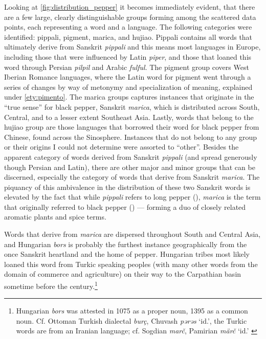 Looking at \cref{fig:distribution_pepper} it becomes immediately evident, that there are a few large, clearly distinguishable groups forming among the scattered data points, each representing a word and a language. The following categories were identified: pippali, pigment, marica, and hujiao. Pippali contains all words that ultimately derive from Sanskrit \textit{pippali} and this means most languages in Europe, including those that were influenced by Latin \textit{piper}, and those that loaned this word through Persian \textit{pilpil} and Arabic \textit{fulful}. The pigment group covers West Iberian Romance languages, where the Latin word for pigment went through a series of changes by way of metonymy and specialization of meaning, explained under \ref{ety:pimento}. The marica groups captures instances that originate in the ``true sense'' for black pepper, Sanskrit \textit{marica}, which is distributed across South, Central, and to a lesser extent Southeast Asia. Lastly, words that belong to the hujiao group are those languages that borrowed their word for black pepper from Chinese, found across the Sinosphere. 
Instances that do not belong to any group or their origins I could not determine were assorted to ``other''. Besides the apparent category of words derived from Sanskrit \textit{pippali} (and spread generously though Persian and Latin), there are other major and minor groups that can be discerned, especially the category of words that derive from Sanskrit \textit{marica}. The piquancy of this ambivalence in the distribution of these two Sanskrit words is elevated by the fact that while \textit{pippali} refers to long pepper (), \textit{marica} is the term that originally referred to black pepper () --- forming a duo of closely related aromatic plants and spice terms.

Words that derive from \textit{marica} are dispersed throughout South and Central Asia, and Hungarian \textit{bors} is probably the furthest instance geographically from the once Sanskrit heartland and the home of pepper. Hungarian tribes most likely loaned this word from Turkic speaking peoples (with many other words from the domain of commerce and agriculture) on their way to the Carpathian basin sometime before the  century.\footnote{Hungarian \textit{bors} was attested in 1075 as a proper noun, 1395 as a common noun. Cf. Ottoman Turkish dialectal \textit{burç}, Chuvash \textit{pərəs} `id.', the Turkic words are from an Iranian language; cf. Sogdian \textit{marč}, Pamirian \textit{märč} `id.' \autocite[90]{zaicz_etimologiai_2006}}



